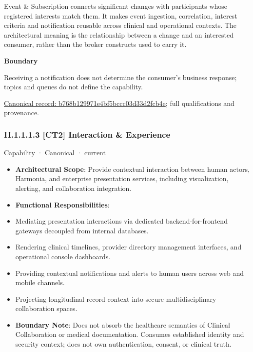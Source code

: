 Event \& Subscription connects significant changes with participants whose registered interests match them. It makes event ingestion, correlation, interest criteria and notification reusable across clinical and operational contexts. The architectural meaning is the relationship between a change and an interested consumer, rather than the broker constructs used to carry it.



\textbf{Boundary}



Receiving a notification does not determine the consumer's business response; topics and queues do not define the capability.


{\footnotesize \href{../../../../../../../continuum/strategy/capability/b768b129971e4bf5bccc03d33d2fcb4e.md}{Canonical record: b768b129971e4bf5bccc03d33d2fcb4e}; full qualifications and provenance.}\par
\subsubsection*{II.1.1.1.3 [CT2] Interaction \& Experience}
\label{navigation:II.1.1.1.3}

\label{element:4ec9757b1c6947b4b70b0f1159b760d3}
{\small Capability · Canonical · current}\par

\begin{itemize}


\item \textbf{Architectural Scope}: Provide contextual interaction between human actors, Harmonia, and enterprise presentation services, including visualization, alerting, and collaboration integration.

\item \textbf{Functional Responsibilities}:

\item Mediating presentation interactions via dedicated backend-for-frontend gateways decoupled from internal databases.

\item Rendering clinical timelines, provider directory management interfaces, and operational console dashboards.

\item Providing contextual notifications and alerts to human users across web and mobile channels.

\item Projecting longitudinal record context into secure multidisciplinary collaboration spaces.

\item \textbf{Boundary Note}: Does not absorb the healthcare semantics of Clinical Collaboration or medical documentation. Consumes established identity and security context; does not own authentication, consent, or clinical truth.

\end{itemize}



